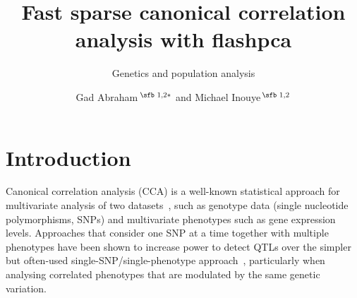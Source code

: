 \documentclass{bioinfo}
\begin{document}

\subtitle{Genetics and population analysis}

\title[Fast SCCA]{Fast sparse canonical correlation analysis with flashpca}
\author[Sample \textit{et~al}.]{Gad Abraham\,$^{\text{\sfb 1,2}*}$
and Michael Inouye\,$^{\text{\sfb 1,2}}$}
\address{$^{\text{\sf 1}}$ Centre for Systems Genomics, School of
BioSciences, University of Melbourne, Parkville 3010, VIC, Australia and \\
$^{\text{\sf 2}}$ Department of Pathology, Faculty of Medicine, Dentistry, and
Health Sciences, University of Melbourne,\\ Parkville 3010, VIC, Australia.}





\maketitle

\section{Introduction}

Canonical correlation analysis (CCA) is a well-known statistical approach
for multivariate analysis of two datasets~\citep{Hotelling1936}, such as
genotype data (single nucleotide polymorphisms, SNPs) and multivariate
phenotypes such as gene expression levels. Approaches that consider one SNP
at a time together with multiple phenotypes have been shown to increase power
to detect QTLs over the simpler but often-used single-SNP/single-phenotype
approach~\citep{Ferreira2009,Inouye2012}, particularly when analysing
correlated phenotypes that are modulated by the same genetic variation.
\end{document}
